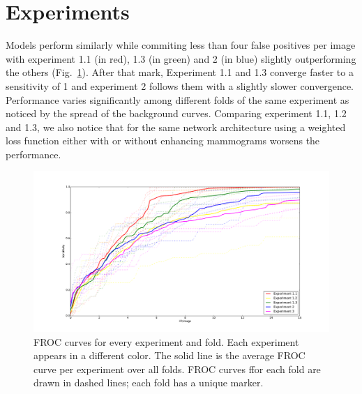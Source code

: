 \section{Experiments}
Models perform similarly while commiting less than four false positives per image with experiment 1.1 (in red), 1.3 (in green) and 2 (in blue) slightly outperforming the others (Fig.~\ref{fig:FROCResults}). After that mark, Experiment 1.1 and 1.3 converge faster to a sensitivity of 1 and experiment 2 follows them with a slightly slower convergence. Performance varies significantly among different folds of the same experiment as noticed by the spread of the background curves. Comparing experiment 1.1, 1.2 and 1.3, we also notice that for the same network architecture using a weighted loss function either with or without enhancing mammograms worsens the performance.
\begin{figure}
	\centering
		\includegraphics[width=\textwidth]{plots/FROC_curves.pdf}
	\caption[FROC curves]{FROC curves for every experiment and fold. Each experiment appears in a different color. The solid line is the average FROC curve per experiment over all folds. FROC curves ffor each fold are drawn in dashed lines; each fold has a unique marker.}
	\label{fig:FROCResults}
\end{figure}

